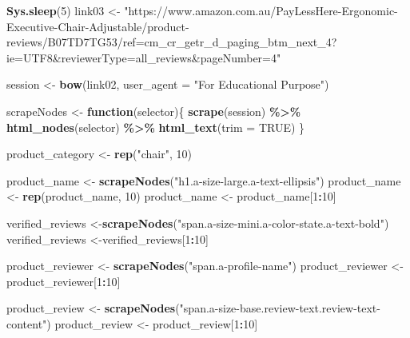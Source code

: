 \documentclass[
]{article}
\newenvironment{Shaded}{\begin{snugshade}}{\end{snugshade}}
\newcommand{\AttributeTok}[1]{\textcolor[rgb]{0.13,0.29,0.53}{#1}}
\newcommand{\ConstantTok}[1]{\textcolor[rgb]{0.56,0.35,0.01}{#1}}
\newcommand{\ControlFlowTok}[1]{\textcolor[rgb]{0.13,0.29,0.53}{\textbf{#1}}}
\newcommand{\DecValTok}[1]{\textcolor[rgb]{0.00,0.00,0.81}{#1}}
\newcommand{\FunctionTok}[1]{\textcolor[rgb]{0.13,0.29,0.53}{\textbf{#1}}}
\newcommand{\NormalTok}[1]{#1}
\newcommand{\OtherTok}[1]{\textcolor[rgb]{0.56,0.35,0.01}{#1}}
\newcommand{\SpecialCharTok}[1]{\textcolor[rgb]{0.81,0.36,0.00}{\textbf{#1}}}
\newcommand{\StringTok}[1]{\textcolor[rgb]{0.31,0.60,0.02}{#1}}
\begin{document}
\begin{Shaded}
\begin{Highlighting}[]
   \FunctionTok{Sys.sleep}\NormalTok{(}\DecValTok{5}\NormalTok{)}
\NormalTok{link03 }\OtherTok{\textless{}{-}} \StringTok{"https://www.amazon.com.au/PayLessHere{-}Ergonomic{-}Executive{-}Chair{-}Adjustable/product{-}reviews/B07TD7TG53/ref=cm\_cr\_getr\_d\_paging\_btm\_next\_4?ie=UTF8\&reviewerType=all\_reviews\&pageNumber=4"}


\NormalTok{  session }\OtherTok{\textless{}{-}} \FunctionTok{bow}\NormalTok{(link02,}
               \AttributeTok{user\_agent =} \StringTok{"For Educational Purpose"}\NormalTok{)}

\NormalTok{  scrapeNodes }\OtherTok{\textless{}{-}} \ControlFlowTok{function}\NormalTok{(selector)\{}
    \FunctionTok{scrape}\NormalTok{(session) }\SpecialCharTok{\%\textgreater{}\%}
      \FunctionTok{html\_nodes}\NormalTok{(selector) }\SpecialCharTok{\%\textgreater{}\%}
      \FunctionTok{html\_text}\NormalTok{(}\AttributeTok{trim =} \ConstantTok{TRUE}\NormalTok{)}
\NormalTok{  \}}

\NormalTok{  product\_category }\OtherTok{\textless{}{-}} \FunctionTok{rep}\NormalTok{(}\StringTok{"chair"}\NormalTok{, }\DecValTok{10}\NormalTok{)}

\NormalTok{  product\_name }\OtherTok{\textless{}{-}} \FunctionTok{scrapeNodes}\NormalTok{(}\StringTok{"h1.a{-}size{-}large.a{-}text{-}ellipsis"}\NormalTok{)}
\NormalTok{  product\_name }\OtherTok{\textless{}{-}} \FunctionTok{rep}\NormalTok{(product\_name, }\DecValTok{10}\NormalTok{)}
\NormalTok{  product\_name }\OtherTok{\textless{}{-}}\NormalTok{ product\_name[}\DecValTok{1}\SpecialCharTok{:}\DecValTok{10}\NormalTok{]}
  
\NormalTok{  verified\_reviews }\OtherTok{\textless{}{-}}\FunctionTok{scrapeNodes}\NormalTok{(}\StringTok{"span.a{-}size{-}mini.a{-}color{-}state.a{-}text{-}bold"}\NormalTok{)}
\NormalTok{  verified\_reviews }\OtherTok{\textless{}{-}}\NormalTok{verified\_reviews[}\DecValTok{1}\SpecialCharTok{:}\DecValTok{10}\NormalTok{]}
  
\NormalTok{  product\_reviewer }\OtherTok{\textless{}{-}} \FunctionTok{scrapeNodes}\NormalTok{(}\StringTok{"span.a{-}profile{-}name"}\NormalTok{)}
\NormalTok{  product\_reviewer }\OtherTok{\textless{}{-}}\NormalTok{ product\_reviewer[}\DecValTok{1}\SpecialCharTok{:}\DecValTok{10}\NormalTok{]}
  
\NormalTok{  product\_review }\OtherTok{\textless{}{-}} \FunctionTok{scrapeNodes}\NormalTok{(}\StringTok{"span.a{-}size{-}base.review{-}text.review{-}text{-}content"}\NormalTok{)}
\NormalTok{  product\_review }\OtherTok{\textless{}{-}}\NormalTok{ product\_review[}\DecValTok{1}\SpecialCharTok{:}\DecValTok{10}\NormalTok{]}
  

\end{Highlighting}
\end{Shaded}
\end{document}
